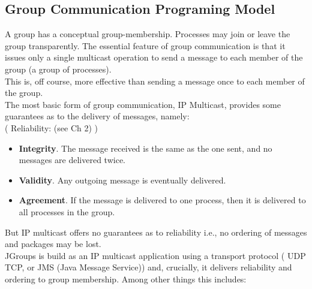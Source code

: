 \subsection{Group Communication Programing Model}

A group has a conceptual group-membership. Processes may join or leave the group transparently. The essential feature of group communication is that it issues only a single multicast operation to send a message to each member of the group (a group of processes). \\

This is, off course, more effective than sending a message once to each member of the group. \\

The most basic form of group communication, IP Multicast, provides some guarantees as to the delivery of messages, namely:\\

( Reliability: (see Ch 2) )

\begin{itemize}
\item \textbf{Integrity}. The message received is the same as the one sent, and no messages are delivered twice. 
\item \textbf{Validity}. Any outgoing  message is eventually delivered.
\item \textbf{Agreement}. If the message is delivered to one process, then it is delivered to all processes in the group.
\end{itemize}

But IP multicast offers no guarantees as to reliability i.e., no ordering of messages and packages may be lost. \\

JGroups is build as an IP multicast application using a transport protocol ( UDP TCP, or JMS (Java Message Service)) 
and, crucially,  it delivers reliability and ordering to group membership. Among other things this includes:\\

\pagebreak

